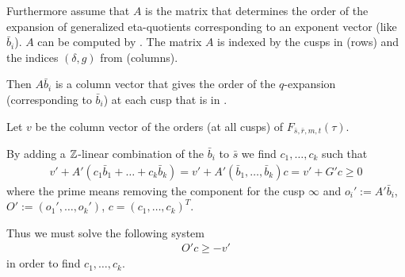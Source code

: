 \documentclass{article}
\begin{document}
Furthermore assume that $A$ is the matrix that determines the order of
the expansion of generalized eta-quotients corresponding to an
exponent vector (like $\bar{b}_i$). $A$ can be computed by
. The matrix $A$ is indexed by
the cusps in  (rows) and the indices $(\delta,g)$ from
 (columns).

Then $A \bar{b}_i$ is a column vector that gives the order of the
$q$-expansion (corresponding to $\bar{b}_i$) at each cusp that is in
.

Let $v$ be the column vector of the orders (at all cusps) of
$F_{\bar{s},\bar{r},m,t}(\tau)$.

By adding a $\setZ$-linear
combination of the $\bar{b}_i$ to $\bar{s}$ we find
$c_1,\ldots,c_k$ such that
\begin{gather}
  v' + A'(c_1\bar{b}_1+\dots+c_k\bar{b}_k)
  =
  v' + A'(\bar{b}_1,\ldots,\bar{b}_k) c
  =
  v' + G' c
  \ge 0
\end{gather}
where the prime means removing the component for the cusp $\infty$
and $o_i':= A' \bar{b}_i$, $O':=(o_1',\ldots,o_k')$,
$c = (c_1,\ldots, c_k)^T$.

Thus we must solve the following system
\begin{gather}
  \label{eq:remove-non-infinity-poles}
  O' c \ge -v'
\end{gather}
in order to find $c_1,\ldots, c_k$.


\iffalse
By subtracting a $\setZ$-linear
combination of the $\bar{b}_i$ from $\bar{s}$ we find
$c_1,\ldots,c_k$ such that
\begin{gather}
  v' - A'(c_1\bar{b}_1+\dots+c_k\bar{b}_k)
  =
  v' - A'(\bar{b}_1,\ldots,\bar{b}_k) c
  =
  - u' + G' c
  \ge 0
\end{gather}
where the prime means removing the component for the cusp $\infty$
and $u':=-v'$, $g_i':= - A' \bar{b}_i$, $G':=(g_1',\ldots,g_k')$,
$c = (c_1,\ldots, c_k)^T$.

In the implementation we work with grades (which is the negation of
the expansion order and corresponds to the pole order of the
expansion). Thus we must solve the following system
\begin{gather}
  \label{eq:remove-non-infinity-poles}
  G' c \ge u'
\end{gather}
in order to find $c_1,\ldots, c_k$.
\fi
\end{document}
